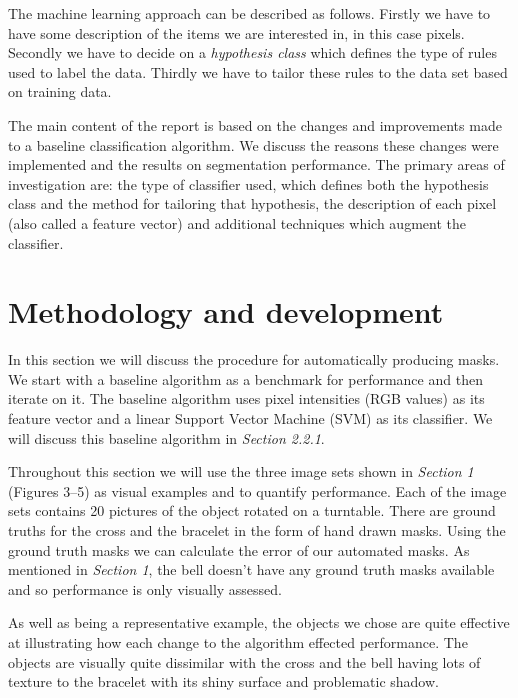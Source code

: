 \documentclass[12pt]{IIBproject}
\begin{document}
The machine learning approach can be described as follows. Firstly we have to have some description of the items we are interested in, in this case pixels. Secondly we have to decide on a \emph{hypothesis class} which defines the type of rules used to label the data. Thirdly we have to tailor these rules to the data set based on training data. 

The main content of the report is based on the changes and improvements made to a baseline classification algorithm. We discuss the reasons these changes were implemented and the results on segmentation performance. The primary areas of investigation are: the type of classifier used, which defines both the hypothesis class and the method for tailoring that hypothesis, the description of each pixel (also called a feature vector) and additional techniques which augment the classifier. 

\section{Methodology and development}

 In this section we will discuss the procedure for automatically producing masks. We start with a baseline algorithm as a benchmark for performance and then iterate on it. The baseline algorithm uses pixel intensities (RGB values) as its feature vector and a linear Support Vector Machine (SVM) \cite{suykens1999least} as its classifier. We will discuss this baseline algorithm in \emph{Section 2.2.1}.
 
 Throughout this section we will use the three image sets shown in \emph{Section 1} (Figures 3--5) as visual examples and to quantify performance.  Each of the image sets contains 20 pictures of the object rotated on a turntable. There are ground truths for the cross and the bracelet in the form of hand drawn masks. Using the ground truth masks we can calculate the error of our automated masks. As mentioned in \emph{Section 1}, the bell doesn't have any ground truth masks available and so performance is only visually assessed. 

As well as being a representative example, the objects we chose are quite effective at illustrating how each change to the algorithm effected performance. The objects are visually quite dissimilar with the cross and the bell having lots of texture to the bracelet with its shiny surface and problematic shadow. 
\end{document}
